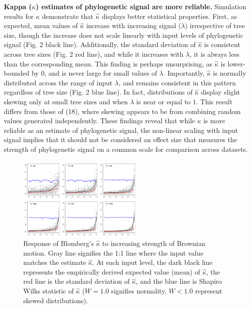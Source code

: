 \documentclass[9pt,twocolumn,twoside,lineno]{pnas-new}
\begin{document}
\textbf{Kappa (\(\kappa\)) estimates of phylogenetic signal are more
reliable.} Simulation results for \(\hat\kappa\) demonstrate that
\(\hat\kappa\) displays better statistical properties. First, as
expected, mean values of \(\hat\kappa\) increase with increasing signal
(\(\lambda\)) irrespective of tree size, though the increase does not
scale linearly with input levels of phylogenetic signal (Fig. 2 black
line). Additionally, the standard deviation of \(\hat\kappa\) is
consistent across tree sizes (Fig. 2 red line), and while it increases
with \(\lambda\), it is always less than the corresponding mean. This
finding is perhaps unsurprising, as \(\hat\kappa\) is lower-bounded by
0, and is never large for small values of \(\lambda\). Importantly,
\(\hat\kappa\) is normally distributed across the range of input
\(\lambda\), and remains consistent in this pattern regardless of tree
size (Fig. 2 blue line). In fact, distributions of \(\hat\kappa\)
display slight skewing only at small tree sizes and when \(\lambda\) is
near or equal to \(1\). This result differs from those of (18), where
skewing appears to be from combining random values generated
independently. These findings reveal that while \(\kappa\) is more
reliable as an estimate of phylogenetic signal, the non-linear scaling
with input signal implies that it should not be considered an effect
size that measures the strength of phylogenetic signal on a common scale
for comparison across datasets.

\begin{figure}
\centering
\includegraphics{fig.2.png}
\caption{Response of Blomberg's \(\hat\kappa\) to increasing strength of
Brownian motion. Gray line signifies the 1:1 line where the input value
matches the estimate \(\hat\kappa\). At each input level, the dark black
line represents the empirically derived expected value (mean) of
\(\hat\kappa\), the red line is the standard deviation of
\(\hat\kappa\), and the blue line is Shapiro Wilks statistic of
\(\hat\kappa\) (\(W=1.0\) signifies normality, \(W< 1.0\) represent
skewed distributions).{}}
\end{figure}
\end{document}
